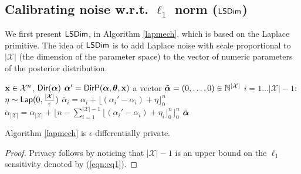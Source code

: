 \documentclass{article}
\begin{document}
\subsection{Calibrating noise w.r.t. $\ell_1$ norm ($\lapmech$)}
\label{sec_ell1_dim}
We first present $\lapmech$, in Algorithm \ref{lapmech}, which is based on the Laplace primitive.
The idea of $\lapmech$ is to add Laplace noise with scale
proportional to $|\mathcal{X}|$ (the dimension of the parameter space) to
the vector of numeric parameters of the posterior distribution.
\begin{algorithm}
  \caption{$\lapmech$}
  \label{lapmech}
  \begin{algorithmic}
  \INPUT $\textbf{x}\in\mathcal{X}^n$, $\mathsf{Dir}(\boldsymbol{\alpha})$
  \STATE {} $\boldsymbol{\alpha}' = \mathsf{DirP}(\boldsymbol{\alpha},\boldsymbol{\theta},\textbf{x})$
  \STATE {} a vector $\tilde{\boldsymbol{\alpha}} = (0, \dots, 0 )\in \mathbb{N}^{|\mathcal{X}|}$ 
  \STATE {} $i = 1 \dots |\mathcal{X}| - 1$:
  \STATE \quad {} $\eta \sim \mathsf{Lap}(0, \frac{|\mathcal{X}|}{\epsilon})$
  \STATE \quad \quad  $\tilde{\alpha_i}=\alpha_i + \lfloor{(\alpha_i' - \alpha_i) + \eta}\rfloor^n_0$ 
  \STATE \quad $\tilde{\alpha}_{|\mathcal{X}|} = \alpha_{|\mathcal{X}|} + \lfloor n - \sum_{i = 1}^{|\mathcal{X}|-1}\lfloor{(\alpha_i' - \alpha_i) + \eta_i}\rfloor^n_0 \rfloor^n_0$
   $\tilde{\boldsymbol{\alpha}}$
  \end{algorithmic}
\end{algorithm}
\begin{lem}
  Algorithm \ref{lapmech} is $\epsilon$-differentially private.
  \begin{proof} Privacy follows by noticing that $|\mathcal{X}|-1$ is an upper bound on the $\ell_1$ sensitivity denoted by (\ref{eqn:eq1}). \end{proof}
\end{lem}
\end{document}
